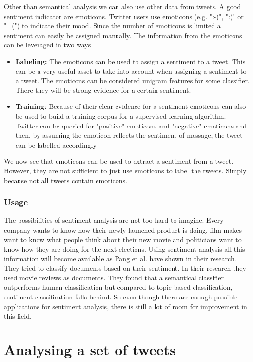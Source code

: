 \documentclass{article}
\begin{document}
Other than semantical analysis we can also use other data from tweets. A good sentiment indicator are emoticons. Twitter users use emoticons (e.g. ":-)", ":(" or "=(") to indicate their mood.\cite{twitterSentiment} Since the number of emoticons is limited a sentiment can easily be assigned manually. The information from the emoticons can be leveraged in two ways
\begin{itemize}
\item \textbf{Labeling:} The emoticons can be used to assign a sentiment to a tweet. This can be a very useful asset to take into account when assigning a sentiment to a tweet. The emoticons can be considered unigram features for some classifier. There they will be strong evidence for a certain sentiment.
\item \textbf{Training:} Because of their clear evidence for a sentiment emoticons can also be used to build a training corpus for a supervised learning algorithm. Twitter can be queried for "positive" emoticons and "negative" emoticons and then, by assuming the emoticon reflects the sentiment of message, the tweet can be labelled accordingly.\cite{moodLens} 
\end{itemize}
We now see that emoticons can be used to extract a sentiment from a tweet. However, they are not sufficient to just use emoticons to label the tweets. Simply because not all tweets contain emoticons.

\subsubsection*{Usage}

The possibilities of sentiment analysis are not too hard to imagine. Every company wants to know how their newly launched product is doing, film makes want to know what people think about their new movie and politicians want to know how they are doing for the next elections. Using sentiment analysis all this information will become available as Pang et al. \cite{machineLearning} have shown in their research. They tried to classify documents based on their sentiment. In their research they used movie reviews as documents. They found that a semantical classifier outperforms human classification but compared to topic-based classification, sentiment classification falls behind. So even though there are enough possible applications for sentiment analysis, there is still a lot of room for improvement in this field.

\section*{Analysing a set of tweets}
\end{document}
